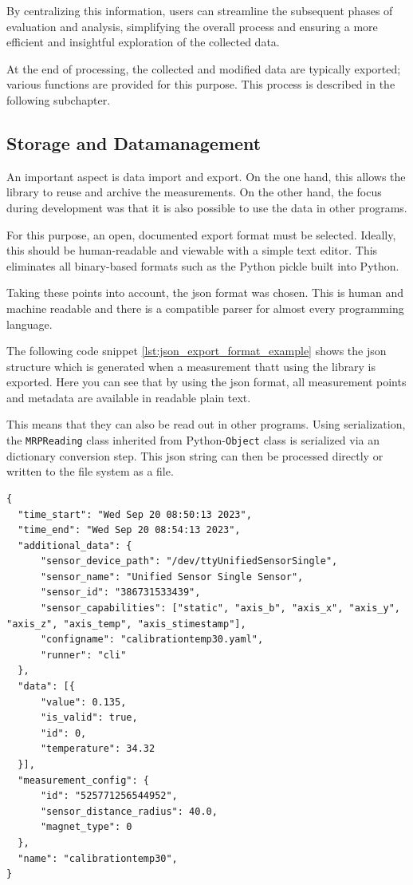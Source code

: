 By centralizing this information, users can streamline the subsequent
phases of evaluation and analysis, simplifying the overall process and
ensuring a more efficient and insightful exploration of the collected
data.

At the end of processing, the collected and modified data are typically
exported; various functions are provided for this purpose. This process
is described in the following subchapter.

\hypertarget{storage-and-datamanagement}{%
\subsection{Storage and
Datamanagement}\label{storage-and-datamanagement}}

An important aspect is data import and export. On the one hand, this
allows the library to reuse and archive the measurements. On the other
hand, the focus during development was that it is also possible to use
the data in other programs.

For this purpose, an open, documented export format must be selected.
Ideally, this should be human-readable and viewable with a simple text
editor. This eliminates all binary-based formats such as the Python
pickle built into Python.

Taking these points into account, the \gls{json} format was chosen. This
is human and machine readable and there is a compatible parser for
almost every programming language.

The following code snippet \ref{lst:json_export_format_example} shows
the \gls{json} structure which is generated when a measurement thatt
using the library is exported. Here you can see that by using the
\gls{json} format, all measurement points and metadata are available in
readable plain text.

This means that they can also be read out in other programs. Using
serialization, the \passthrough{\lstinline!MRPReading!} class inherited
from Python-\passthrough{\lstinline!Object!} class is serialized via an
dictionary conversion step. This \gls{json} string can then be processed
directly or written to the file system as a file.

\begin{lstlisting}[caption={JSON export structure of an MRPReading based measurement}, label=lst:json_export_format_example]
{
  "time_start": "Wed Sep 20 08:50:13 2023",
  "time_end": "Wed Sep 20 08:54:13 2023",
  "additional_data": {
      "sensor_device_path": "/dev/ttyUnifiedSensorSingle",
      "sensor_name": "Unified Sensor Single Sensor",
      "sensor_id": "386731533439",
      "sensor_capabilities": ["static", "axis_b", "axis_x", "axis_y", "axis_z", "axis_temp", "axis_stimestamp"],
      "configname": "calibrationtemp30.yaml",
      "runner": "cli"
  },
  "data": [{
      "value": 0.135,
      "is_valid": true,
      "id": 0,
      "temperature": 34.32
  }],
  "measurement_config": {
      "id": "525771256544952",
      "sensor_distance_radius": 40.0,
      "magnet_type": 0
  },
  "name": "calibrationtemp30",
}
\end{lstlisting}

